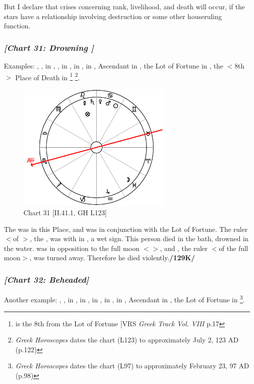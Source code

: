 But I declare that crises concerning rank, livelihood, and death will occur, if the stars have a relationship involving destruction or some other houseruling function.
\newpage
\subsubsection{\textit{[Chart 31: Drowning ]}}
Examples: \Sun, \Mars, \Venus\xspace in \Cancer, \Saturn, \Mercury\xspace in \Leo, \Jupiter\xspace in \Aquarius, \Moon\xspace in \Pisces, Ascendant in \Scorpio, the Lot of Fortune in \Leo, the $<$8th$>$ Place of Death in \Pisces\footnote{\Pisces\xspace is the 8th from the Lot of Fortune [VRS \textit{Greek Track Vol. VIII} p.17}
\footnote{\textit{Greek Horoscopes} dates the chart (L123) to approximately July 2, 123 AD (p.122)}.

\clearpage
\begin{figure}
\centering
\includegraphics[width=0.68\textwidth]{charts/2_41_1}
\caption{Chart 31 [II.41.1, GH L123]}
\label{fig:chart31}
\end{figure} 

The \Moon\xspace was in this Place, and \Saturn\xspace was in conjunction with the Lot of Fortune. The ruler $<$of \Leo$>$, the \Sun, was with \Mars\xspace in \Cancer, a wet sign. This person died in the bath, drowned in the water. \Mars\xspace was in opposition to the full moon $<$\Capricorn$>$, and \Saturn, the ruler $<$of the full moon$>$, was turned away. Therefore he died violently.\textbf{/129K/}
\newpage
\subsubsection{\textit{[Chart 32: Beheaded]}}
Another example: \Sun, \Mercury, \Venus\xspace in \Pisces, \Saturn\xspace in \Virgo, \Jupiter\xspace in \Aries, \Mars\xspace in \Taurus, \Moon\xspace in \Sagittarius, Ascendant in \Leo, the Lot of Fortune in \Taurus
\footnote{\textit{Greek Horoscopes} dates the chart (L97) to approximately February 23, 97 AD (p.98)}.  


